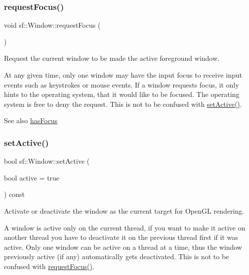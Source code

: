 \subsubsection{\texorpdfstring{request\+Focus()}{requestFocus()}}
{\footnotesize\ttfamily void sf\+::\+Window\+::request\+Focus (\begin{DoxyParamCaption}{ }\end{DoxyParamCaption})}



Request the current window to be made the active foreground window. 

At any given time, only one window may have the input focus to receive input events such as keystrokes or mouse events. If a window requests focus, it only hints to the operating system, that it would like to be focused. The operating system is free to deny the request. This is not to be confused with \hyperlink{classsf_1_1_window_aaab549da64cedf74fa6f1ae7a3cc79e0}{set\+Active()}.

\begin{DoxySeeAlso}{See also}
\hyperlink{classsf_1_1_window_ad8db2e6500d13ca9396281296404ba31}{has\+Focus} 
\end{DoxySeeAlso}
\mbox{\label{classsf_1_1_window_aaab549da64cedf74fa6f1ae7a3cc79e0}} 
\subsubsection{\texorpdfstring{set\+Active()}{setActive()}}
{\footnotesize\ttfamily bool sf\+::\+Window\+::set\+Active (\begin{DoxyParamCaption}\item[{bool}]{active = {\ttfamily true} }\end{DoxyParamCaption}) const}



Activate or deactivate the window as the current target for Open\+GL rendering. 

A window is active only on the current thread, if you want to make it active on another thread you have to deactivate it on the previous thread first if it was active. Only one window can be active on a thread at a time, thus the window previously active (if any) automatically gets deactivated. This is not to be confused with \hyperlink{classsf_1_1_window_a58cf7fa1775e8e7542032e3ecfa83b49}{request\+Focus()}.


